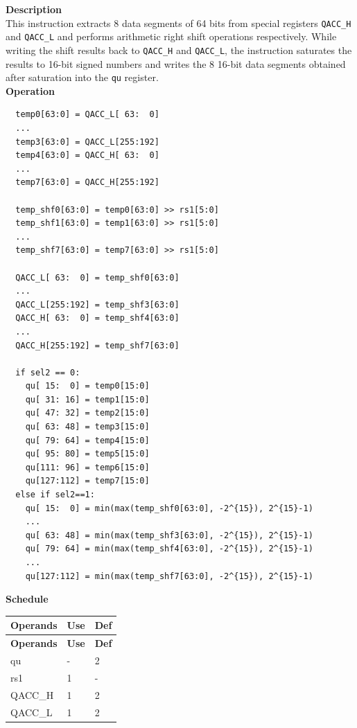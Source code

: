 \textbf{Description}\\
This instruction extracts 8 data segments of 64 bits from special registers \lstinline{QACC_H} and \lstinline{QACC_L} and performs arithmetic right shift operations respectively. While writing the shift results back to \lstinline{QACC_H} and \lstinline{QACC_L}, the instruction saturates the results to 16-bit signed numbers and writes the 8 16-bit data segments obtained after saturation into the \lstinline{qu} register.\\
\textbf{Operation}
\begin{lstlisting}
  temp0[63:0] = QACC_L[ 63:  0]
  ...
  temp3[63:0] = QACC_L[255:192]
  temp4[63:0] = QACC_H[ 63:  0]
  ...
  temp7[63:0] = QACC_H[255:192]

  temp_shf0[63:0] = temp0[63:0] >> rs1[5:0]
  temp_shf1[63:0] = temp1[63:0] >> rs1[5:0]
  ...
  temp_shf7[63:0] = temp7[63:0] >> rs1[5:0]

  QACC_L[ 63:  0] = temp_shf0[63:0]
  ...
  QACC_L[255:192] = temp_shf3[63:0]
  QACC_H[ 63:  0] = temp_shf4[63:0]
  ...
  QACC_H[255:192] = temp_shf7[63:0]

  if sel2 == 0:
    qu[ 15:  0] = temp0[15:0]
    qu[ 31: 16] = temp1[15:0]
    qu[ 47: 32] = temp2[15:0]
    qu[ 63: 48] = temp3[15:0]
    qu[ 79: 64] = temp4[15:0]
    qu[ 95: 80] = temp5[15:0]
    qu[111: 96] = temp6[15:0]
    qu[127:112] = temp7[15:0]
  else if sel2==1:
    qu[ 15:  0] = min(max(temp_shf0[63:0], -2^{15}), 2^{15}-1)
    ...
    qu[ 63: 48] = min(max(temp_shf3[63:0], -2^{15}), 2^{15}-1)
    qu[ 79: 64] = min(max(temp_shf4[63:0], -2^{15}), 2^{15}-1)
    ...
    qu[127:112] = min(max(temp_shf7[63:0], -2^{15}), 2^{15}-1)
\end{lstlisting}

\textbf{Schedule}\\
\begin{longtable}[c]{|l|l|l|}
    \hline
    \rowcolor{lightgray}
    \textbf{Operands} & \textbf{Use} & \textbf{Def} \\\hline
    \endfirsthead
    \hline
    \rowcolor{lightgray}
     \textbf{Operands} & \textbf{Use} & \textbf{Def} \\\hline
    \endhead
    \hline
    \endfoot

  qu & - & 2 \\\hline
  rs1 & 1 & - \\\hline
  QACC\_H & 1 & 2 \\\hline
  QACC\_L & 1 & 2

\end{longtable}

